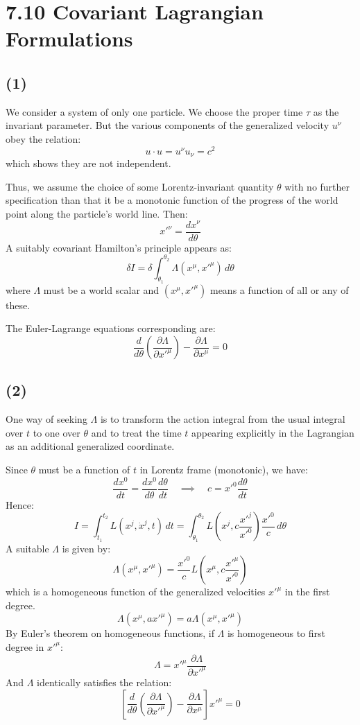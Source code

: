 \documentclass{article}
\begin{document}
    \section*{7.10 Covariant Lagrangian Formulations}
    
    \subsection*{(1)}
    We consider a system of only one particle. We choose the proper time $\tau$ as the invariant parameter. But the various components of the generalized velocity $u^\nu$ obey the relation:
    $$ u \cdot u = u^\nu u_\nu = c^2 $$
    which shows they are not independent.
    
    Thus, we assume the choice of some Lorentz-invariant quantity $\theta$ with no further specification than that it be a monotonic function of the progress of the world point along the particle's world line. Then:
    $$ x'^\nu = \frac{dx^\nu}{d\theta} $$
    A suitably covariant Hamilton's principle appears as:
    $$ \delta I = \delta \int_{\theta_1}^{\theta_2} \Lambda(x^\mu, x'^\mu) \, d\theta $$
    where $\Lambda$ must be a world scalar and $(x^\mu, x'^\mu)$ means a function of all or any of these.
    
    The Euler-Lagrange equations corresponding are:
    $$ \frac{d}{d\theta} \left(\frac{\partial \Lambda}{\partial x'^\mu}\right) - \frac{\partial \Lambda}{\partial x^\mu} = 0 $$
    
    \subsection*{(2)}
    One way of seeking $\Lambda$ is to transform the action integral from the usual integral over $t$ to one over $\theta$ and to treat the time $t$ appearing explicitly in the Lagrangian as an additional generalized coordinate.
    
    Since $\theta$ must be a function of $t$ in Lorentz frame (monotonic), we have:
    $$ \frac{dx^0}{dt} = \frac{dx^0}{d\theta} \frac{d\theta}{dt} \quad \implies \quad c = x'^0 \frac{d\theta}{dt} $$
    Hence:
    $$ I = \int_{t_1}^{t_2} L(x^j, \dot{x}^j, t) \, dt = \int_{\theta_1}^{\theta_2} L\left(x^j, c\frac{x'^j}{x'^0}\right) \frac{x'^0}{c} \, d\theta $$
    A suitable $\Lambda$ is given by:
    $$ \Lambda(x^\mu, x'^\mu) = \frac{x'^0}{c} L\left(x^\mu, c\frac{x'^\mu}{x'^0}\right) $$
    which is a homogeneous function of the generalized velocities $x'^\mu$ in the first degree.
    $$ \Lambda(x^\mu, a x'^\mu) = a \Lambda(x^\mu, x'^\mu) $$
    By Euler's theorem on homogeneous functions, if $\Lambda$ is homogeneous to first degree in $x'^\mu$:
    $$ \Lambda = x'^\mu \frac{\partial \Lambda}{\partial x'^\mu} $$
    And $\Lambda$ identically satisfies the relation:
    $$ \left[ \frac{d}{d\theta}\left(\frac{\partial \Lambda}{\partial x'^\mu}\right) - \frac{\partial \Lambda}{\partial x^\mu} \right] x'^\mu = 0 $$
    
\end{document}
